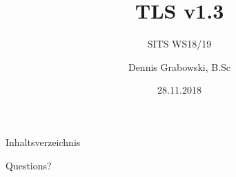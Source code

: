 \documentclass{f4_beamer_metropolis}
\title{TLS v1.3}
\subtitle{SITS WS18/19}
\author{Dennis Grabowski, B.Sc}
\date{28.11.2018}
\begin{document}
\begin{frame}{Inhaltsverzeichnis}
    \tableofcontents[hideallsubsections]
  \end{frame}

\begin{frame}[standout]
  Questions?
\end{frame}
\end{document}

